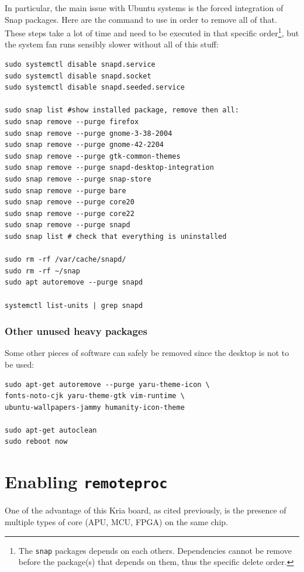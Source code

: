 \documentclass[10pt]{article}
\begin{document}
In particular, the main issue with Ubuntu systems is the forced integration of
Snap packages. Here are the command to use in order to remove all of that.
These steps take a lot of time and need to be executed in that specific order\footnote{The \texttt{snap} packages depends on each others. Dependencies
cannot be remove before the package(s) that depends on them,
thus the specific delete order.},
but the system fan runs sensibly slower without all of this stuff:

\begin{verbatim}
sudo systemctl disable snapd.service
sudo systemctl disable snapd.socket
sudo systemctl disable snapd.seeded.service

sudo snap list #show installed package, remove then all:
sudo snap remove --purge firefox
sudo snap remove --purge gnome-3-38-2004
sudo snap remove --purge gnome-42-2204
sudo snap remove --purge gtk-common-themes
sudo snap remove --purge snapd-desktop-integration
sudo snap remove --purge snap-store
sudo snap remove --purge bare
sudo snap remove --purge core20
sudo snap remove --purge core22
sudo snap remove --purge snapd
sudo snap list # check that everything is uninstalled

sudo rm -rf /var/cache/snapd/
sudo rm -rf ~/snap
sudo apt autoremove --purge snapd

systemctl list-units | grep snapd
\end{verbatim}

\subsubsection{Other unused heavy packages}
\label{sec:orgdc89054}
Some other pieces of software can safely be removed since the desktop is
not to be used:

\begin{verbatim}
sudo apt-get autoremove --purge yaru-theme-icon \
fonts-noto-cjk yaru-theme-gtk vim-runtime \
ubuntu-wallpapers-jammy humanity-icon-theme

sudo apt-get autoclean
sudo reboot now
\end{verbatim}

\section{Enabling \texttt{remoteproc}}
\label{sec:orgac86bcd}
One of the advantage of this Kria board, as cited previously, is the presence of
multiple types of core (APU, MCU, FPGA) on the same chip.
\end{document}
